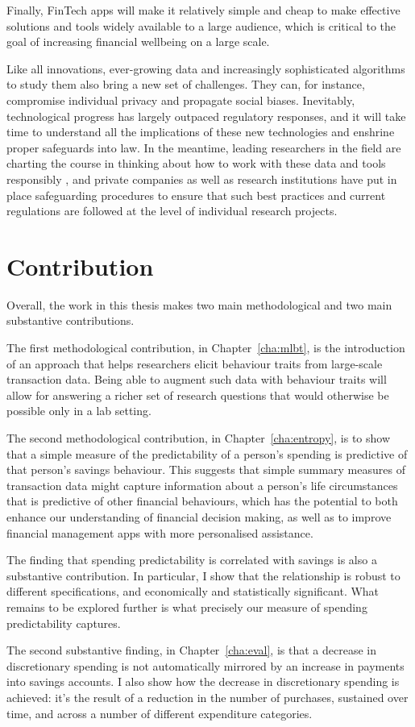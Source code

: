 Finally, FinTech apps will make it relatively simple and cheap to make
effective solutions and tools widely available to a large audience, which is
critical to the goal of increasing financial wellbeing on a large scale.

Like all innovations, ever-growing data and increasingly sophisticated algorithms to study them also bring a new set of challenges. They can, for instance, compromise individual privacy and propagate
social biases. Inevitably, technological progress has largely outpaced
regulatory responses, and it will take time to understand all the implications
of these new technologies and enshrine proper safeguards into law. In the
meantime, leading researchers in the field are charting the course in thinking
about how to work with these data and tools responsibly
\citep{demontjoye2015unique, kosinski2015facebook, blumenstock2018don}, and
private companies as well as research institutions have put in place
safeguarding procedures to ensure that such best practices and current
regulations are followed at the level of individual research projects.

{\color{blue}
\section{Contribution}

Overall, the work in this thesis makes two main methodological and two main substantive contributions.

The first methodological contribution, in Chapter~\ref{cha:mlbt}, is the introduction of an approach that helps researchers elicit behaviour traits from large-scale transaction data. Being able to augment such data with behaviour traits will allow for answering a richer set of research questions that would otherwise be possible only in a lab setting.

The second methodological contribution, in Chapter~\ref{cha:entropy}, is to show that a simple measure of the predictability of a person's spending is predictive of that person's savings behaviour. This suggests that simple summary measures of transaction data might capture information about a person's life circumstances that is predictive of other financial behaviours, which has the potential to both enhance our understanding of financial decision making, as well as to improve financial management apps with more personalised assistance.

The finding that spending predictability is correlated with savings is also a substantive contribution. In particular, I show that the relationship is robust to different specifications, and economically and statistically significant. What remains to be explored further is what precisely our measure of spending predictability captures.

The second substantive finding, in Chapter~\ref{cha:eval}, is that a decrease in discretionary spending is not automatically mirrored by an increase in payments into savings accounts. I also show how the decrease in discretionary spending is achieved: it's the result of a reduction in the number of purchases, sustained over time, and across a number of different expenditure categories.}


